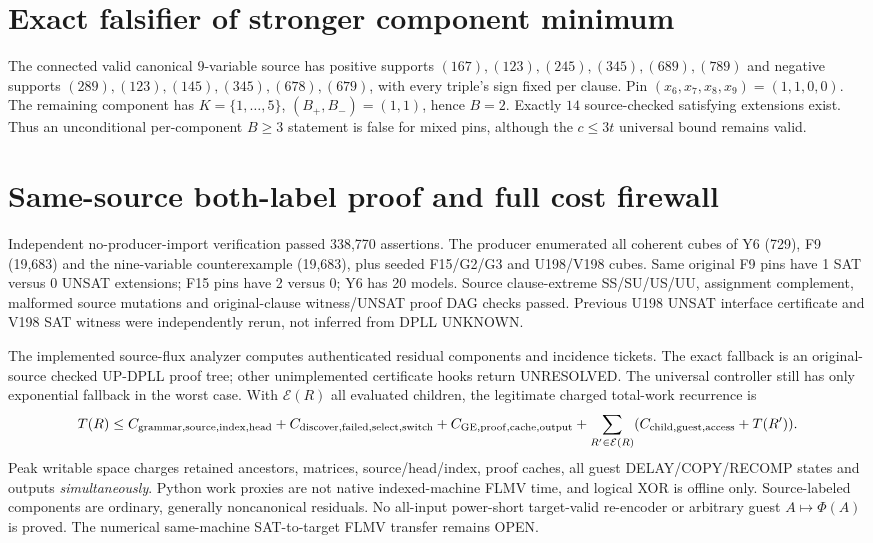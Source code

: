 \documentclass[11pt]{article}
\begin{document}
\section{Exact falsifier of stronger component minimum}
The connected valid canonical $9$-variable source has positive supports
$(167),(123),(245),(345),(689),(789)$ and negative supports
$(289),(123),(145),(345),(678),(679)$, with every triple's sign fixed per clause.
Pin $(x_6,x_7,x_8,x_9)=(1,1,0,0)$.
The remaining component has $K=\{1,\ldots,5\}$, $(B_+,B_-)=(1,1)$, hence $B=2$. Exactly $14$ source-checked satisfying extensions exist. Thus an unconditional per-component $B\ge3$ statement is false for mixed pins, although the $c\le3t$ universal bound remains valid.

\section{Same-source both-label proof and full cost firewall}
Independent no-producer-import verification passed 338,770 assertions. The producer enumerated all coherent cubes of Y6 (729), F9 (19,683) and the nine-variable counterexample (19,683), plus seeded F15/G2/G3 and U198/V198 cubes. Same original F9 pins have 1 SAT versus 0 UNSAT extensions; F15 pins have 2 versus 0; Y6 has 20 models. Source clause-extreme SS/SU/US/UU, assignment complement, malformed source mutations and original-clause witness/UNSAT proof DAG checks passed. Previous U198 UNSAT interface certificate and V198 SAT witness were independently rerun, not inferred from DPLL UNKNOWN.

The implemented source-flux analyzer computes authenticated residual components and incidence tickets. The exact fallback is an original-source checked UP-DPLL proof tree; other unimplemented certificate hooks return UNRESOLVED. The universal controller still has only exponential fallback in the worst case. With $\mathcal E(R)$ all evaluated children, the legitimate charged total-work recurrence is
\[
T(R)\le C_{\rm grammar,source,index,head}
+C_{\rm discover,failed,select,switch}
+C_{\rm GE,proof,cache,output}
+\sum_{R'\in\mathcal E(R)}(C_{\rm child,guest,access}+T(R')).
\]
Peak writable space charges retained ancestors, matrices, source/head/index, proof caches, all guest DELAY/COPY/RECOMP states and outputs \emph{simultaneously}. Python work proxies are not native indexed-machine FLMV time, and logical XOR is offline only. Source-labeled components are ordinary, generally noncanonical residuals. No all-input power-short target-valid re-encoder or arbitrary guest $A\mapsto\Phi(A)$ is proved. The numerical same-machine SAT-to-target FLMV transfer remains OPEN.
\end{document}
